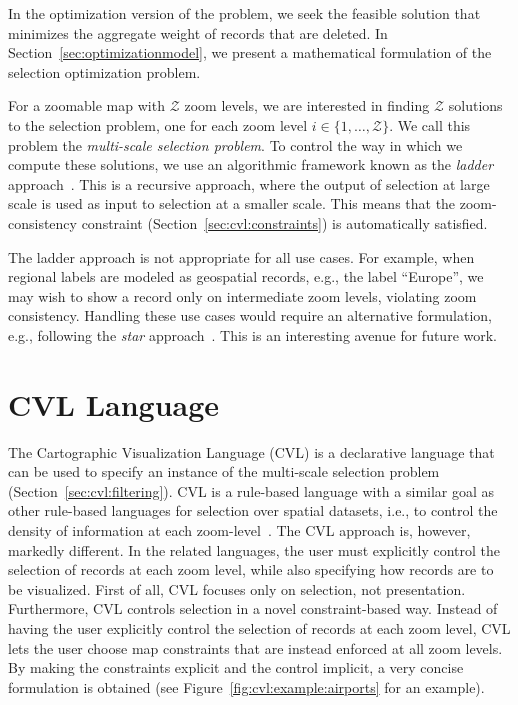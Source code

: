 \documentclass[11pt, oneside]{report}
\begin{document}
In the optimization version of the problem, we seek the feasible solution that minimizes the aggregate weight of records that are deleted. In Section~\ref{sec:optimizationmodel}, we present a mathematical formulation of the selection optimization problem.

For a zoomable map with $\mathcal{Z}$ zoom levels, we are interested in finding $\mathcal{Z}$ solutions to the selection problem, one for each zoom level $i \in \{ 1, \ldots, \mathcal{Z} \}$. We call this problem the \emph{multi-scale selection problem}. To control the way in which we compute these solutions, we use an algorithmic framework known as the \emph{ladder} approach~\cite{foerster2010challenges}. This is a recursive approach, where the output of selection at large scale is used as input to selection at a smaller scale. This means that the zoom-consistency constraint (Section~\ref{sec:cvl:constraints}) is automatically satisfied.

The ladder approach is not appropriate for all use cases. For example, when regional labels are modeled as geospatial records, e.g., the label ``Europe'', we may wish to show a record only on intermediate zoom levels, violating zoom consistency. Handling these use cases would require an alternative formulation, e.g., following the \emph{star} approach~\cite{foerster2010challenges}. This is an interesting avenue for future work.  


\section{CVL Language}
\label{sec:cvl:language}
The Cartographic Visualization Language (CVL) is a declarative language that can be used to specify an instance of the multi-scale selection problem (Section~\ref{sec:cvl:filtering}). CVL is a rule-based language with a similar goal as other rule-based languages for selection over spatial datasets, i.e., to control the density of information at each zoom-level~\cite{sld,mapnik}. The CVL approach is, however, markedly different. In the related languages, the user must explicitly control the selection of records at each zoom level, while also specifying how records are to be visualized. First of all, CVL focuses only on selection, not presentation. Furthermore, CVL controls selection in a novel constraint-based way. Instead of having the user explicitly control the selection of records at each zoom level, CVL lets the user choose map constraints that are instead enforced at all zoom levels. By making the constraints explicit and the control implicit, a very concise formulation is obtained (see Figure~\ref{fig:cvl:example:airports} for an example).
\end{document}
